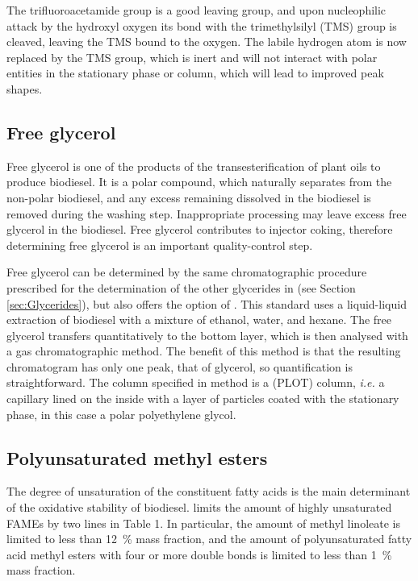 The trifluoroacetamide group is a good leaving group, and upon nucleophilic
attack by the hydroxyl oxygen its bond with the trimethylsilyl (TMS) group is
cleaved, leaving the TMS bound to the oxygen. The labile hydrogen atom is now
replaced by the TMS group, which is inert and will not interact with polar
entities in the stationary phase or column, which will lead to improved peak
shapes.

\subsection{Free glycerol}

Free glycerol is one of the products of the transesterification of plant oils to
produce biodiesel. It is a polar compound, which naturally separates from the
non-polar biodiesel, and any excess remaining dissolved in the biodiesel is
removed during the washing step. Inappropriate processing may leave excess free
glycerol in the biodiesel. Free glycerol contributes to injector coking,
therefore determining free glycerol is an important quality-control step.

Free glycerol can be determined by the same chromatographic procedure prescribed
for the determination of the other glycerides in  (see Section
\ref{sec:Glycerides}), but  also offers the option of . This standard uses a liquid-liquid extraction of biodiesel with a
mixture of ethanol, water, and hexane. The free glycerol transfers
quantitatively to the bottom layer, which is then analysed with a gas
chromatographic method. The benefit of this method is that the resulting
chromatogram has only one peak, that of glycerol, so quantification is
straightforward. The column specified in  method is a
 (PLOT) column, \textit{i.e.} a capillary
lined on the inside with a layer of particles coated with the stationary phase,
in this case a polar polyethylene glycol.

\subsection{Polyunsaturated methyl esters}
\label{sec:ChromDetUnsat}

The degree of unsaturation of the constituent fatty acids is the main
determinant of the oxidative stability of biodiesel.  limits the
amount of highly unsaturated FAMEs by two lines in Table 1. In particular, the
amount of methyl linoleate is limited to less than \SI{12}{\percent} mass
fraction, and the amount of polyunsaturated fatty acid methyl esters with four
or more double bonds is limited to less than \SI{1}{\percent} mass fraction.


